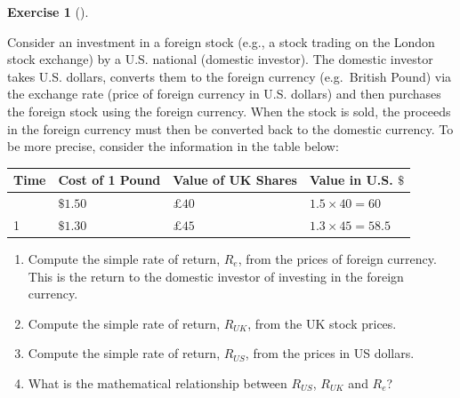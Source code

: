 \documentclass[
  letterpaper,
  DIV=11,
  numbers=noendperiod]{scrreprt}
\providecommand{\tightlist}{%
  \setlength{\itemsep}{0pt}\setlength{\parskip}{0pt}}\usepackage{longtable,booktabs,array}
\theoremstyle{definition}
\newtheorem{exercise}{Exercise}[chapter]
\theoremstyle{definition}
\theoremstyle{remark}
\begin{document}
\begin{exercise}[]\protect\hypertarget{exr-exercise0109}{}\label{exr-exercise0109}

Consider an investment in a foreign stock (e.g., a stock trading on the
London stock exchange) by a U.S. national (domestic investor). The
domestic investor takes U.S. dollars, converts them to the foreign
currency (e.g.~British Pound) via the exchange rate (price of foreign
currency in U.S. dollars) and then purchases the foreign stock using the
foreign currency. When the stock is sold, the proceeds in the foreign
currency must then be converted back to the domestic currency. To be
more precise, consider the information in the table below:

\begin{longtable}[]{@{}llll@{}}
\toprule\noalign{}
Time & Cost of 1 Pound & Value of UK Shares & Value in U.S. \(\$\) \\
\midrule\noalign{}
\endhead
\bottomrule\noalign{}
\endlastfoot
0 & \(\$1.50\) & \(£40\) & \(1.5\times40=60\) \\
1 & \(\$1.30\) & \(£45\) & \(1.3\times45=58.5\) \\
\end{longtable}

\begin{enumerate}
\def\labelenumi{\arabic{enumi}.}
\tightlist
\item
  Compute the simple rate of return, \(R_{e}\), from the prices of
  foreign currency. This is the return to the domestic investor of
  investing in the foreign currency.
\item
  Compute the simple rate of return, \(R_{UK}\), from the UK stock
  prices.
\item
  Compute the simple rate of return, \(R_{US}\), from the prices in US
  dollars.
\item
  What is the mathematical relationship between \(R_{US}\), \(R_{UK}\)
  and \(R_{e}\)?
\end{enumerate}

\end{exercise}
\end{document}
